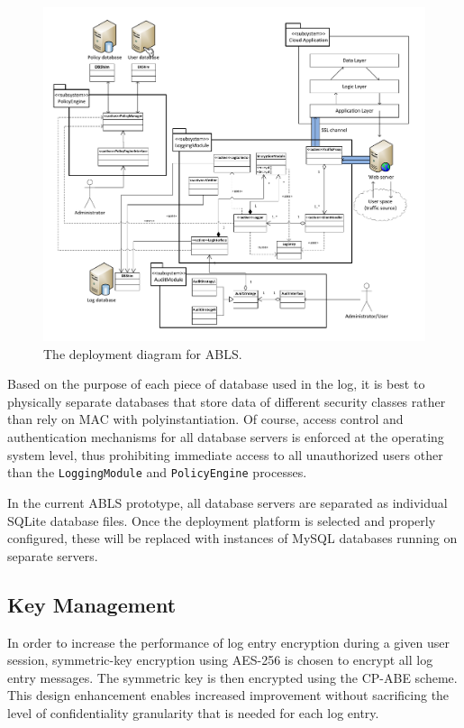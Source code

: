 \documentclass{sig-alternate}
\begin{document}
\begin{figure}[htb!]
\label{fig:design}
\begin{center}
\includegraphics[width=7in]{images/design.pdf}
\caption{The deployment diagram for ABLS.}
\end{center}
\end{figure}

Based on the purpose of each piece of database used in the log, it is best to physically separate databases
that store data of different security classes rather than rely on MAC with polyinstantiation. Of course, access control
and authentication mechanisms for all database servers is enforced at the operating system level, thus
prohibiting immediate access to all unauthorized users other than the {\tt LoggingModule} and {\tt PolicyEngine} 
processes. 

In the current ABLS prototype, all database servers are separated as individual SQLite database files. Once
the deployment platform is selected and properly configured, these will be replaced with instances of MySQL 
databases running on separate servers.

\subsection{Key Management}
In order to increase the performance of log entry encryption during a given user session, symmetric-key encryption
using AES-256 is chosen to encrypt all log entry messages. The symmetric key is then encrypted using the CP-ABE
scheme. This design enhancement enables increased improvement without sacrificing the level of confidentiality 
granularity that is needed for each log entry. 
\end{document}
